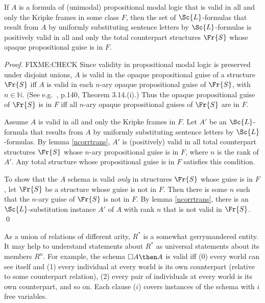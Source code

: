 \documentclass[11pt]{woarticle}
\theoremstyle{break}
\theoremstyle{nonumberplain}
\newcommand{\1}{\;\,|\;\,}
\begin{document}
\begin{theorem}{\label{corrtrans}}
  If $A$ is a formula of (unimodal) propositional modal logic that is valid in
  all and only the Kripke frames in some class $F$, then the set of
  $\Sc{L}$-formulas that result from $A$ by uniformly substituting sentence
  letters by $\Sc{L}$-formulas is positively valid in all and only the total
  counterpart structures $\Fr{S}$ whose opaque propositional guise is in $F$.
\end{theorem}

\begin{proof}
  FIXME:CHECK
  Since validity in propositional modal logic is preserved under
  disjoint unions, $A$ is valid in the opaque propositional guise of a
  structure $\Fr{S}$ iff $A$ is valid in each $n$-ary opaque
  propositional guise of $\Fr{S}$, with $n\in \mathbb{N}$. (See e.g.\
  \cite{blackburn01modal}, p.140, Theorem 3.14.(i).) Thus the opaque
  propositional guise of $\Fr{S}$ is in $F$ iff all $n$-ary opaque
  propositional guises of $\Fr{S}$ are in $F$.

  Assume $A$ is valid in all and only the Kripke frames in $F$. Let
  $A'$ be an $\Sc{L}$-formula that results from $A$ by uniformly
  substituting sentence letters by $\Sc{L}$-formulas. By lemma
  \ref{ncorrtrans}, $A'$ is (positively) valid in all total
  counterpart structures $\Fr{S}$ whose $n$-ary propositional guise is
  in $F$, where $n$ is the rank of $A'$. Any total structure whose
  propositional guise is in $F$ satisfies this condition.

  To show that the $A$ schema is valid \emph{only} in structures
  $\Fr{S}$ whose guise is in $F$, let $\Fr{S}$ be a structure whose
  guise is not in $F$. Then there is some $n$ such that the $n$-ary
  guise of $\Fr{S}$ is not in $F$. By lemma \ref{ncorrtrans}, there is
  an $\Sc{L}$-substitution instance $A'$ of $A$ with rank $n$ that is
  not valid in $\Fr{S}$. \qed
\end{proof}

As a union of relations of different arity, $R^*$ is a somewhat gerrymandered
entity. It may help to understand statements about $R^*$ as universal statements
about its members $R^n$. For example, the schema $\Box A \then A$ is valid iff
(0) every world can see itself and (1) every individual at every world is its
own counterpart (relative to some counterpart relation), (2) every pair of
individuals at every world is its own counterpart, and so on. Each clause ($i$)
covers instances of the schema with $i$ free variables.
\end{document}
